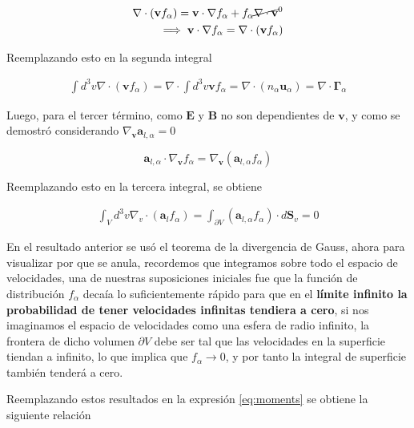 		\begin{eqnarray*}
			\nabla\cdot(\textbf{v}f_\alpha) = \textbf{v}\cdot\nabla f_\alpha + f_\alpha \cancel{\nabla\cdot\textbf{v}}^{0} \\
			\implies \textbf{v}\cdot\nabla f_\alpha = \nabla\cdot(\textbf{v}f_\alpha)
		\end{eqnarray*}
		
		Reemplazando esto en la segunda integral
		
		\begin{eqnarray*}
      \int d^3v \nabla\cdot(\textbf{v}f_\alpha) = \nabla\cdot \int d^3v \textbf{v}f_\alpha = \nabla\cdot(n_\alpha \textbf{u}_\alpha) = \nabla\cdot\pmb{\Gamma}_\alpha 
    \end{eqnarray*}
		
    Luego, para el tercer t\'ermino, como $\textbf{E}$ y $\textbf{B}$ no son dependientes de $\textbf{v}$, y como se demostr\'o considerando $\nabla_\textbf{v}\textbf{a}_{l,\alpha} = 0$

    \begin{equation*}
      \textbf{a}_{l, \alpha}\cdot \nabla_\textbf{v} f_\alpha = \nabla_\textbf{v}(\textbf{a}_{l,\alpha}f_\alpha)
    \end{equation*}
		
		Reemplazando esto en la tercera integral, se obtiene
		
		\begin{eqnarray*}
      \int_V d^3v \nabla_v\cdot(\textbf{a}_lf_\alpha) = \int_{\partial V} (\textbf{a}_{l,\alpha}f_\alpha) \cdot d\textbf{S}_v = 0
		\end{eqnarray*}	
		
    En el resultado anterior se us\'o el teorema de la divergencia de Gauss, ahora para visualizar por que se anula, recordemos que integramos sobre todo el espacio de velocidades, una de nuestras suposiciones iniciales fue que la funci\'on de distribuci\'on $f_\alpha$ deca\'ia lo suficientemente r\'apido para que en el \textbf{l\'imite infinito la probabilidad de tener velocidades infinitas tendiera a cero}, si nos imaginamos el espacio de velocidades como una esfera de radio infinito, la frontera de dicho volumen $\partial V$ debe ser tal que las velocidades en la superficie tiendan a infinito, lo que implica que $f_\alpha \rightarrow 0$, y por tanto la integral de superficie tambi\'en tender\'a a cero.

Reemplazando estos resultados en la expresi\'on \eqref{eq:moments} se obtiene la siguiente relaci\'on

